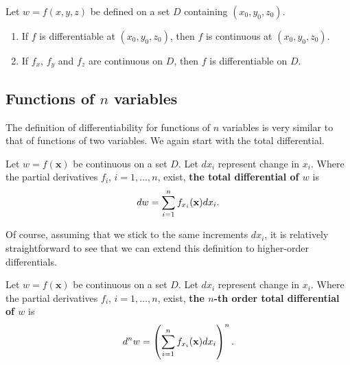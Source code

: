 \ifcalculus\pagebreak\fi
\begin{theorem}\label{thm:differentiable3}
Let $w=f(x,y,z)$ be defined on a set $D$ containing $(x_0,y_0,z_0)$. 
\begin{enumerate}
\item	If $f$ is differentiable at $(x_0,y_0,z_0)$, then $f$ is continuous at $(x_0,y_0,z_0)$.
\item If $f_x$, $f_y$  and $f_z$ are continuous on $D$, then $f$ is differentiable on $D$.
\end{enumerate}
\end{theorem}
\fi


\ifanalysis
\subsection{Functions of $n$ variables}


The definition of differentiability for functions of $n$ variables is very similar to that of functions of two variables. We again start with the total differential.

\begin{definition}\label{def:total_differential3}
Let $w=f(\mathbf{x})$ be continuous on a set $D$. Let $dx_i$ represent change in $x_i$. Where the partial derivatives $f_i$, $i=1,\ldots,n$, exist, \textbf{the total differential of $w$} is
$$dw = \displaystyle\sum\limits_{i=1}^nf_{x_i}(\mathbf{x})dx_i.$$
\end{definition}

Of course, assuming that we stick to the same increments $dx_i$, it is relatively straightforward to see that we can extend this definition to higher-order differentials.


\begin{definition}\label{def:total_differential4}
Let $w=f(\mathbf{x})$ be continuous on a set $D$. Let $dx_i$ represent change in $x_i$. Where the partial derivatives $f_i$, $i=1,\ldots,n$, exist, \textbf{the $n$-th order total differential of $w$} is
$$d^n w =\left( \displaystyle\sum\limits_{i=1}^nf_{x_i}(\mathbf{x})dx_i\right)^n.$$
\end{definition}

